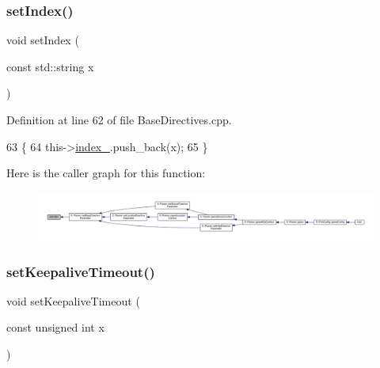 \subsubsection{\texorpdfstring{set\+Index()}{setIndex()}}
{\footnotesize\ttfamily void set\+Index (\begin{DoxyParamCaption}\item[{const std\+::string}]{x }\end{DoxyParamCaption})\hspace{0.3cm}{\ttfamily [inherited]}}



Definition at line 62 of file Base\+Directives.\+cpp.


\begin{DoxyCode}
63     \{
64         this->\hyperlink{classft_1_1_base_directives_a6ba30626837f300201cd32c35d50aa49}{index\_}.push\_back(x);
65     \}
\end{DoxyCode}
Here is the caller graph for this function\+:
\nopagebreak
\begin{figure}[H]
\begin{center}
\leavevmode
\includegraphics[width=350pt]{classft_1_1_base_directives_a6d3d8fd6eaaf71304128af6b3cee2a69_icgraph}
\end{center}
\end{figure}
\mbox{\label{classft_1_1_base_directives_a0818b8529872ba9622329e2118d20c39}} 
\subsubsection{\texorpdfstring{set\+Keepalive\+Timeout()}{setKeepaliveTimeout()}}
{\footnotesize\ttfamily void set\+Keepalive\+Timeout (\begin{DoxyParamCaption}\item[{const unsigned int}]{x }\end{DoxyParamCaption})\hspace{0.3cm}{\ttfamily [inherited]}}




